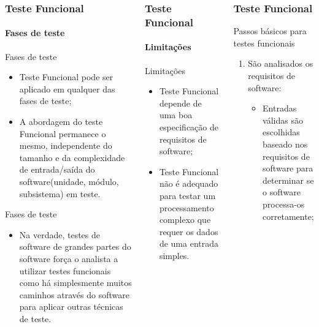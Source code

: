 \begin{frame}[parent={cmap:functional-testing}, hasprev=false, hasnext=true]
\begin{frame}[hasprev=true, hasnext=true]
\begin{columns}[t]
\begin{frame}
\frametitle{Teste Funcional}
\framesubtitle{Fases de teste}

\begin{block:fact}{Fases de teste}
\begin{itemize}
	\item Teste Funcional pode ser aplicado em qualquer das fases de teste;

	\item A abordagem do teste Funcional  permanece o mesmo, independente do tamanho
	e da complexidade de entrada/saída do software(unidade, módulo, subsistema)
	em teste.
\end{itemize}
\end{block:fact}


\begin{block:fact}{Fases de teste}
\begin{itemize}
	\item Na verdade, testes de software de grandes partes do software força o analista
	a utilizar testes funcionais como há simplesmente muitos caminhos através do
	software para aplicar outras técnicas de teste.
\end{itemize}
\end{block:fact}
\end{frame}


\begin{frame}
\frametitle{Teste Funcional}
\framesubtitle{Limitações}

\begin{block:fact}{Limitações}
\begin{itemize}
	\item Teste Funcional depende de uma boa especificação de requisitos de software;

	\item Teste Funcional não é adequado para testar um processamento complexo
	que requer os dados de uma entrada simples.
\end{itemize}
\end{block:fact}
\end{frame}



\begin{frame}[hasprev=true, hasnext=false]
\frametitle{Teste Funcional}

\begin{block:procedure}{Passos básicos para testes funcionais}
\begin{enumerate}
	\item São analisados os requisitos de software:
	\begin{itemize}
		\item Entradas válidas são escolhidas baseado nos requisitos de software
		para determinar se o software processa-os corretamente;


\end{itemize}
\end{enumerate}
\end{block:procedure}
\end{frame}
\end{columns}
\end{frame}
\end{frame}
